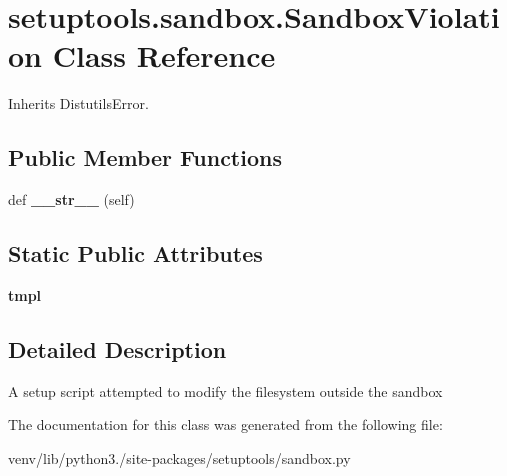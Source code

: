 \hypertarget{classsetuptools_1_1sandbox_1_1_sandbox_violation}{}\section{setuptools.\+sandbox.\+Sandbox\+Violation Class Reference}
\label{classsetuptools_1_1sandbox_1_1_sandbox_violation}


Inherits Distutils\+Error.

\subsection*{Public Member Functions}
\begin{DoxyCompactItemize}
\item 
\mbox{\label{classsetuptools_1_1sandbox_1_1_sandbox_violation_afb6e074e1ead4616653fcb9ca1dac655}} 
def {\bfseries \+\_\+\+\_\+str\+\_\+\+\_\+} (self)
\end{DoxyCompactItemize}
\subsection*{Static Public Attributes}
\begin{DoxyCompactItemize}
\item 
\mbox{\label{classsetuptools_1_1sandbox_1_1_sandbox_violation_a9ad18d8a93d06a6b96fca910177998d6}} 
{\bfseries tmpl}
\end{DoxyCompactItemize}


\subsection{Detailed Description}
\begin{DoxyVerb}A setup script attempted to modify the filesystem outside the sandbox\end{DoxyVerb}
 

The documentation for this class was generated from the following file\+:\begin{DoxyCompactItemize}
\item 
venv/lib/python3./site-\/packages/setuptools/sandbox.\+py\end{DoxyCompactItemize}

